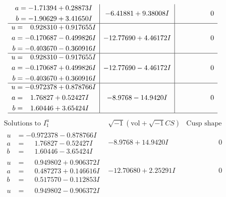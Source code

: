 \documentclass[1p]{elsarticle_modified}
\theoremstyle{definition}
\newcommand{\I}{\sqrt{-1}}
\begin{document}
$$\begin{array}{c|c|c}
\begin{aligned}
a &= -1.71394 + 0.28873 I \\
b &= -1.90629 + 3.41650 I\end{aligned}
 & -6.41881 + 9.38008 I & \phantom{-0.000000 } 0 \\ \hline\begin{aligned}
u &= \phantom{-}0.928310 + 0.917655 I \\
a &= -0.170687 - 0.499826 I \\
b &= -0.403670 - 0.360916 I\end{aligned}
 & -12.77690 + 4.46172 I & \phantom{-0.000000 } 0 \\ \hline\begin{aligned}
u &= \phantom{-}0.928310 - 0.917655 I \\
a &= -0.170687 + 0.499826 I \\
b &= -0.403670 + 0.360916 I\end{aligned}
 & -12.77690 - 4.46172 I & \phantom{-0.000000 } 0 \\ \hline\begin{aligned}
u &= -0.972378 + 0.878766 I \\
a &= \phantom{-}1.76827 + 0.52427 I \\
b &= \phantom{-}1.60446 + 3.65424 I\end{aligned}
 & -8.9768 - 14.9420 I & \phantom{-0.000000 } 0\\
 \hline 
 \end{array}$$\newpage$$\begin{array}{c|c|c}  
\text{Solutions to }I^u_{1}& \I (\text{vol} + \sqrt{-1}CS) & \text{Cusp shape}\\
 \hline 
\begin{aligned}
u &= -0.972378 - 0.878766 I \\
a &= \phantom{-}1.76827 - 0.52427 I \\
b &= \phantom{-}1.60446 - 3.65424 I\end{aligned}
 & -8.9768 + 14.9420 I & \phantom{-0.000000 } 0 \\ \hline\begin{aligned}
u &= \phantom{-}0.949802 + 0.906372 I \\
a &= \phantom{-}0.487273 + 0.146616 I \\
b &= \phantom{-}0.517570 - 0.112853 I\end{aligned}
 & -12.70680 + 2.25291 I & \phantom{-0.000000 } 0 \\ \hline\begin{aligned}
u &= \phantom{-}0.949802 - 0.906372 I \\

\end{aligned}
\end{array}$$
\end{document}

